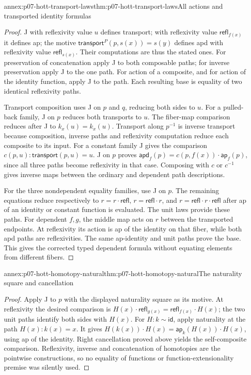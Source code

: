 \begin{annexitem}{annex:p07-hott-transport-laws}{thm:p07-hott-transport-laws}{All actions and transported identity formulas}
\begin{proof}
J with reflexivity value $u$ defines transport; with reflexivity value
$\mathsf{refl}_{f(x)}$ it defines ap; the motive
$\mathsf{transport}^{P}(p,s(x))=s(y)$ defines apd with reflexivity value
$\mathsf{refl}_{s(x)}$. Their computations are thus the stated ones.
For preservation of concatenation apply J to both composable paths;
for inverse preservation apply J to the one path. For action of a
composite, and for action of the identity function, apply J to the path.
Each resulting base is equality of two identical reflexivity paths.

Transport composition uses J on $p$ and $q$, reducing both sides to $u$.
For a pulled-back family, J on $p$ reduces both transports to $u$.
The fiber-map comparison reduces after J to $k_x(u)=k_x(u)$.
Transport along $p^{-1}$ is inverse transport because composition,
inverse paths and reflexivity computation reduce each composite to its
input. For a constant family J gives the comparison
$c(p,u):\mathsf{transport}(p,u)=u$. J on $p$ proves
$\mathsf{apd}_f(p)=c(p,f(x))\cdot\mathsf{ap}_f(p)$, since all three
paths become reflexivity in that case. Composing with $c$ or $c^{-1}$
gives inverse maps between the ordinary and dependent path descriptions.

For the three nondependent equality families, use J on $p$. The
remaining equations reduce respectively to $r=r\cdot\mathsf{refl}$,
$r=\mathsf{refl}\cdot r$, and
$r=\mathsf{refl}\cdot r\cdot\mathsf{refl}$ after ap of an identity
or constant function is evaluated. The unit laws provide these paths.
For dependent $f,g$, the middle map acts on $r$ between the transported
endpoints. At reflexivity its action is ap of the identity on that
fiber, while both apd paths are reflexivities. The same ap-identity
and unit paths prove the base. This gives the corrected typed dependent
formula without equating elements from different fibers.
\end{proof}
\end{annexitem}

\begin{annexitem}{annex:p07-hott-homotopy-natural}{thm:p07-hott-homotopy-natural}{The naturality square and cancellation}
\begin{proof}
Apply J to $p$ with the displayed naturality square as its motive.
At reflexivity the desired comparison is
$H(x)\cdot\mathsf{refl}_{g(x)}=\mathsf{refl}_{f(x)}\cdot H(x)$;
the two unit paths identify both sides with $H(x)$.
For $H:k\sim\mathsf{id}$, apply naturality at the path
$H(x):k(x)=x$. It gives
$H(k(x))\cdot H(x)=\mathsf{ap}_k(H(x))\cdot H(x)$,
using ap of the identity. Right cancellation proved above yields the
self-composite comparison. Reflexivity, inverse and concatenation of
homotopies are the pointwise constructions, so no equality of functions
or function-extensionality premise was silently used.
\end{proof}
\end{annexitem}

